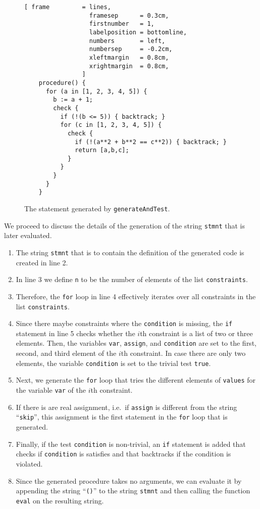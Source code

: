 \begin{figure}[!ht]
\centering
\begin{Verbatim}[ frame         = lines, 
                  framesep      = 0.3cm, 
                  firstnumber   = 1,
                  labelposition = bottomline,
                  numbers       = left,
                  numbersep     = -0.2cm,
                  xleftmargin   = 0.8cm,
                  xrightmargin  = 0.8cm,
                ]
    procedure() {
      for (a in [1, 2, 3, 4, 5]) {
        b := a + 1;
        check {
          if (!(b <= 5)) { backtrack; }
          for (c in [1, 2, 3, 4, 5]) {
            check {
              if (!(a**2 + b**2 == c**2)) { backtrack; }
              return [a,b,c];
            }
          }
        }
      }
    }
\end{Verbatim}
\vspace*{-0.3cm}
\caption{The statement generated by \texttt{generateAndTest}.}
\label{fig:generateAndTest.stlx-code}
\end{figure}
\noindent
We proceed to discuss the details of the generation of the string \texttt{stmnt} that is later
evaluated.  
\begin{enumerate}
\item The string \texttt{stmnt} that is to contain the definition of the generated code is
      created in line 2.
\item In line 3 we define \texttt{n} to be the number of elements of the list \texttt{constraints}.
\item Therefore, the \texttt{for} loop in line 4 effectively iterates over all constraints in the
      list \texttt{constraints}.
\item Since there maybe constraints where the \texttt{condition} is missing, the \texttt{if}
      statement in line 5 checks whether the $i$th constraint is a list of two or three elements.
      Then, the variables \texttt{var}, \texttt{assign}, and
      \texttt{condition} are set to the first, second, and third element of the $i$th constraint.
      In case there are only two elements, the variable \texttt{condition} is set to the trivial
      test \texttt{true}.
\item Next, we generate the \texttt{for} loop that tries the different elements of \texttt{values}
      for the variable \texttt{var} of the $i$th constraint.
\item If there is are real assignment, i.e.~if \texttt{assign} is different from the string
      ``\texttt{skip}'', this assignment is the first statement in the \texttt{for} loop that is generated.
\item Finally, if the test \texttt{condition} is non-trivial, an \texttt{if} statement is added that
      checks if \texttt{condition} is satisfies and that backtracks if the condition is violated.
\item Since the generated procedure takes no arguments, we can evaluate it by appending the string
      ``\texttt{()}'' to the string \texttt{stmnt} and then calling the function \texttt{eval} on
      the resulting string.
\end{enumerate}


